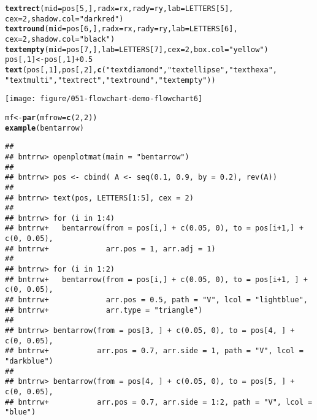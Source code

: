 \documentclass{article}\usepackage[]{graphicx}\usepackage[]{color}
\makeatletter
\def\maxwidth{ %
  \ifdim\Gin@nat@width>\linewidth
    \linewidth
  \else
    \Gin@nat@width
  \fi
}
\newcommand{\hlnum}[1]{\textcolor[rgb]{0.686,0.059,0.569}{#1}}%
\newcommand{\hlstr}[1]{\textcolor[rgb]{0.192,0.494,0.8}{#1}}%
\newcommand{\hlopt}[1]{\textcolor[rgb]{0,0,0}{#1}}%
\newcommand{\hlstd}[1]{\textcolor[rgb]{0.345,0.345,0.345}{#1}}%
\newcommand{\hlkwb}[1]{\textcolor[rgb]{0.69,0.353,0.396}{#1}}%
\newcommand{\hlkwc}[1]{\textcolor[rgb]{0.333,0.667,0.333}{#1}}%
\newcommand{\hlkwd}[1]{\textcolor[rgb]{0.737,0.353,0.396}{\textbf{#1}}}%
\newenvironment{kframe}{%
 \def\at@end@of@kframe{}%
 \ifinner\ifhmode%
  \def\at@end@of@kframe{\end{minipage}}%
  \begin{minipage}{\columnwidth}%
 \fi\fi%
 \def\FrameCommand##1{\hskip\@totalleftmargin \hskip-\fboxsep
 \colorbox{shadecolor}{##1}\hskip-\fboxsep
     \hskip-\linewidth \hskip-\@totalleftmargin \hskip\columnwidth}%
 \MakeFramed {\advance\hsize-\width
   \@totalleftmargin\z@ \linewidth\hsize
   \@setminipage}}%
 {\par\unskip\endMakeFramed%
 \at@end@of@kframe}
\newenvironment{knitrout}{}{} %
\makeatother
\begin{document}
\begin{knitrout}
\begin{kframe}
\begin{alltt}
\hlkwd{textrect}\hlstd{(}\hlkwc{mid} \hlstd{= pos[}\hlnum{5}\hlstd{, ],} \hlkwc{radx} \hlstd{= rx,} \hlkwc{rady} \hlstd{= ry,} \hlkwc{lab} \hlstd{= LETTERS[}\hlnum{5}\hlstd{],}
    \hlkwc{cex} \hlstd{=} \hlnum{2}\hlstd{,} \hlkwc{shadow.col} \hlstd{=} \hlstr{"darkred"}\hlstd{)}
\hlkwd{textround}\hlstd{(}\hlkwc{mid} \hlstd{= pos[}\hlnum{6}\hlstd{, ],} \hlkwc{radx} \hlstd{= rx,} \hlkwc{rady} \hlstd{= ry,} \hlkwc{lab} \hlstd{= LETTERS[}\hlnum{6}\hlstd{],}
    \hlkwc{cex} \hlstd{=} \hlnum{2}\hlstd{,} \hlkwc{shadow.col} \hlstd{=} \hlstr{"black"}\hlstd{)}
\hlkwd{textempty}\hlstd{(}\hlkwc{mid} \hlstd{= pos[}\hlnum{7}\hlstd{, ],} \hlkwc{lab} \hlstd{= LETTERS[}\hlnum{7}\hlstd{],} \hlkwc{cex} \hlstd{=} \hlnum{2}\hlstd{,} \hlkwc{box.col} \hlstd{=} \hlstr{"yellow"}\hlstd{)}
\hlstd{pos[,} \hlnum{1}\hlstd{]} \hlkwb{<-} \hlstd{pos[,} \hlnum{1}\hlstd{]} \hlopt{+} \hlnum{0.5}
\hlkwd{text}\hlstd{(pos[,} \hlnum{1}\hlstd{], pos[,} \hlnum{2}\hlstd{],} \hlkwd{c}\hlstd{(}\hlstr{"textdiamond"}\hlstd{,} \hlstr{"textellipse"}\hlstd{,} \hlstr{"texthexa"}\hlstd{,}
    \hlstr{"textmulti"}\hlstd{,} \hlstr{"textrect"}\hlstd{,} \hlstr{"textround"}\hlstd{,} \hlstr{"textempty"}\hlstd{))}
\end{alltt}
\end{kframe}
\texttt{[image: figure/051-flowchart-demo-flowchart6]} 
\begin{kframe}\begin{alltt}
\hlstd{mf} \hlkwb{<-} \hlkwd{par}\hlstd{(}\hlkwc{mfrow} \hlstd{=} \hlkwd{c}\hlstd{(}\hlnum{2}\hlstd{,} \hlnum{2}\hlstd{))}
\hlkwd{example}\hlstd{(bentarrow)}
\end{alltt}
\begin{verbatim}
## 
## bntrrw> openplotmat(main = "bentarrow")
## 
## bntrrw> pos <- cbind( A <- seq(0.1, 0.9, by = 0.2), rev(A))
## 
## bntrrw> text(pos, LETTERS[1:5], cex = 2)
## 
## bntrrw> for (i in 1:4) 
## bntrrw+   bentarrow(from = pos[i,] + c(0.05, 0), to = pos[i+1,] + c(0, 0.05),
## bntrrw+             arr.pos = 1, arr.adj = 1)
## 
## bntrrw> for (i in 1:2) 
## bntrrw+   bentarrow(from = pos[i,] + c(0.05, 0), to = pos[i+1, ] + c(0, 0.05),
## bntrrw+             arr.pos = 0.5, path = "V", lcol = "lightblue", 
## bntrrw+             arr.type = "triangle")
## 
## bntrrw> bentarrow(from = pos[3, ] + c(0.05, 0), to = pos[4, ] + c(0, 0.05),
## bntrrw+           arr.pos = 0.7, arr.side = 1, path = "V", lcol = "darkblue")
## 
## bntrrw> bentarrow(from = pos[4, ] + c(0.05, 0), to = pos[5, ] + c(0, 0.05),
## bntrrw+           arr.pos = 0.7, arr.side = 1:2, path = "V", lcol = "blue")

\end{verbatim}
\end{kframe}
\end{knitrout}
\end{document}
